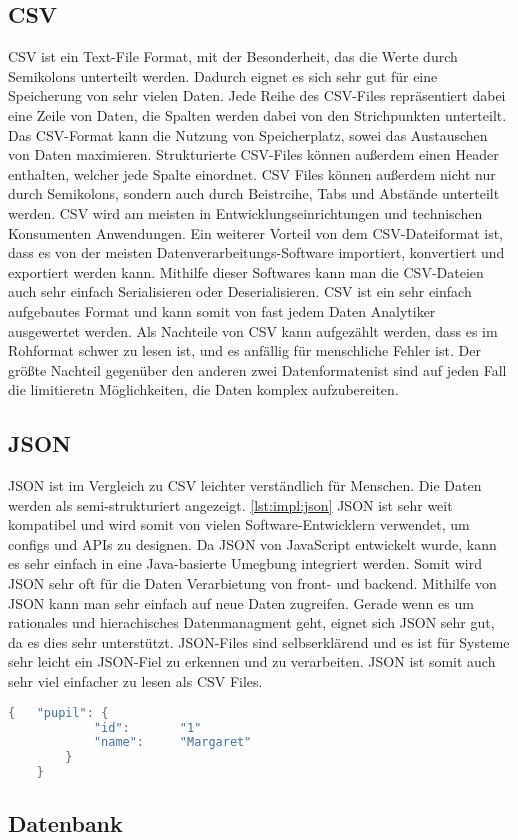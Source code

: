 \subsection{CSV}
CSV ist ein Text-File Format, mit der Besonderheit, das die Werte durch Semikolons unterteilt werden. Dadurch eignet es sich sehr gut für eine Speicherung von sehr vielen Daten. Jede Reihe des CSV-Files repräsentiert dabei eine Zeile von Daten, die Spalten werden dabei von den Strichpunkten unterteilt. Das CSV-Format kann die Nutzung von Speicherplatz, sowei das Austauschen von Daten maximieren. Strukturierte CSV-Files können außerdem einen Header enthalten, welcher jede Spalte einordnet. CSV Files können außerdem nicht nur durch Semikolons, sondern auch durch Beistrcihe, Tabs und Abstände unterteilt werden. CSV wird am meisten in Entwicklungseinrichtungen und technischen Konsumenten Anwendungen. Ein weiterer Vorteil von dem CSV-Dateiformat ist, dass es von der meisten Datenverarbeitungs-Software importiert, konvertiert und exportiert werden kann. Mithilfe dieser Softwares kann man die CSV-Dateien auch sehr einfach Serialisieren oder Deserialisieren. CSV ist ein sehr einfach aufgebautes Format und kann somit von fast jedem Daten Analytiker ausgewertet werden. Als Nachteile von CSV kann aufgezählt werden, dass es im Rohformat schwer zu lesen ist, und es anfällig für menschliche Fehler ist. Der größte Nachteil gegenüber den anderen zwei Datenformatenist sind auf jeden Fall die limitieretn Möglichkeiten, die Daten komplex aufzubereiten.   


\subsection{JSON}
JSON ist im Vergleich zu CSV leichter verständlich für Menschen. Die Daten werden als semi-strukturiert angezeigt. \ref{lst:impl:json} JSON ist sehr weit kompatibel und wird somit von vielen Software-Entwicklern verwendet, um configs und APIs zu designen. Da JSON von JavaScript entwickelt wurde, kann es sehr einfach in eine Java-basierte Umegbung integriert werden. Somit wird JSON sehr oft für die Daten Verarbietung von front- und backend. Mithilfe von JSON kann man sehr einfach auf neue Daten zugreifen. Gerade wenn es um rationales und hierachisches Datenmanagment geht, eignet sich JSON sehr gut, da es dies sehr unterstützt. JSON-Files sind selbserklärend und es ist für Systeme sehr leicht ein JSON-Fiel zu erkennen und zu verarbeiten. JSON ist somit auch sehr viel einfacher zu lesen als CSV Files. 


\begin{lstlisting}[language=java,caption=JSON Beispiel,label=lst:impl:json]
    {   "pupil": {
            "id":       "1"
            "name":     "Margaret"
        }
    }
\end{lstlisting}

\subsection{Datenbank}